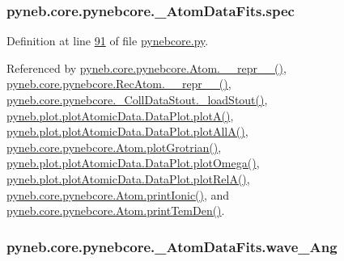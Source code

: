 \hypertarget{classpyneb_1_1core_1_1pynebcore_1_1___atom_data_fits_a28f8a716cd11ea24726de792fdfb5573}{
\subsubsection[{spec}]{\setlength{\rightskip}{0pt plus 5cm}pyneb.\-core.\-pynebcore.\-\_\-\-Atom\-Data\-Fits.\-spec}}\label{classpyneb_1_1core_1_1pynebcore_1_1___atom_data_fits_a28f8a716cd11ea24726de792fdfb5573}


Definition at line \hyperlink{pynebcore_8py_source_l00091}{91} of file \hyperlink{pynebcore_8py_source}{pynebcore.\-py}.



Referenced by \hyperlink{pynebcore_8py_source_l02615}{pyneb.\-core.\-pynebcore.\-Atom.\-\_\-\-\_\-repr\-\_\-\-\_\-()}, \hyperlink{pynebcore_8py_source_l03154}{pyneb.\-core.\-pynebcore.\-Rec\-Atom.\-\_\-\-\_\-repr\-\_\-\-\_\-()}, \hyperlink{pynebcore_8py_source_l01178}{pyneb.\-core.\-pynebcore.\-\_\-\-Coll\-Data\-Stout.\-\_\-load\-Stout()}, \hyperlink{plot_atomic_data_8py_source_l00117}{pyneb.\-plot.\-plot\-Atomic\-Data.\-Data\-Plot.\-plot\-A()}, \hyperlink{plot_atomic_data_8py_source_l00189}{pyneb.\-plot.\-plot\-Atomic\-Data.\-Data\-Plot.\-plot\-All\-A()}, \hyperlink{pynebcore_8py_source_l02443}{pyneb.\-core.\-pynebcore.\-Atom.\-plot\-Grotrian()}, \hyperlink{plot_atomic_data_8py_source_l00373}{pyneb.\-plot.\-plot\-Atomic\-Data.\-Data\-Plot.\-plot\-Omega()}, \hyperlink{plot_atomic_data_8py_source_l00262}{pyneb.\-plot.\-plot\-Atomic\-Data.\-Data\-Plot.\-plot\-Rel\-A()}, \hyperlink{pynebcore_8py_source_l02233}{pyneb.\-core.\-pynebcore.\-Atom.\-print\-Ionic()}, and \hyperlink{pynebcore_8py_source_l02324}{pyneb.\-core.\-pynebcore.\-Atom.\-print\-Tem\-Den()}.

\hypertarget{classpyneb_1_1core_1_1pynebcore_1_1___atom_data_fits_a904df923201dd16936845199622afc76}{
\subsubsection[{wave\-\_\-\-Ang}]{\setlength{\rightskip}{0pt plus 5cm}pyneb.\-core.\-pynebcore.\-\_\-\-Atom\-Data\-Fits.\-wave\-\_\-\-Ang}}\label{classpyneb_1_1core_1_1pynebcore_1_1___atom_data_fits_a904df923201dd16936845199622afc76}


